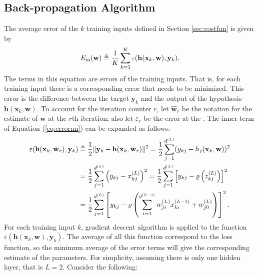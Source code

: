 \subsection{Back-propagation Algorithm}\label{sec:backprop}
The average error of the $k$ training inputs defined in Section \ref{sec:costfun} is given by
\begin{equation}\label{eq:errornn}
E_{\mathrm{in}}(\mathbf{w})\triangleq\frac{1}{K}\sum_{k=1}^{K}\varepsilon(\mathbf{h}(\mathbf{x}_k,\mathbf{w}),\mathbf{y}_k).
\end{equation}
The terms in this equation are errors of the training inputs. That is, for each training input there is a corresponding error that needs to be minimized. This error is the difference between the target $\mathbf{y}_k$ and the output of the hypothesis $\mathbf{h}(\mathbf{x}_k,\mathbf{w})$. To account for the iteration counter $r$, let $\hat{\mathbf{w}}_r$ be the notation for the estimate of $\mathbf{w}$ at the $r$th iteration; also let $\varepsilon_r$ be the error at the . The inner term of Equation (\ref{eq:errornn}) can be expanded as follows:
\begin{align}
\varepsilon(\mathbf{h}(\mathbf{x}_k,\hat{\mathbf{w}}_r),\mathbf{y}_k)&\triangleq\frac{1}{2}\lVert\mathbf{y}_k-\mathbf{h}(\mathbf{x}_k,\hat{\mathbf{w}}_r)\rVert^2=\frac{1}{2}\sum_{j=1}^{d^{(L)}}(y_{kj}-h_j(\mathbf{x}_k,\mathbf{w}))^2\nonumber\\
&=\frac{1}{2}\sum_{j=1}^{d^{(L)}}\left(y_{kj}-x_{kj}^{(L)}\right)^2=\frac{1}{2}\sum_{j=1}^{d^{(L)}}\left[y_{kj}-\varrho\left(z_{kj}^{(L)}\right)\right]^2\nonumber\\
&=\frac{1}{2}\sum_{j=1}^{d^{(L)}}\left[y_{kj}-\varrho\left(\sum_{i=1}^{d^{(L-1)}}w_{ji}^{(L)}x_{ki}^{(L-1)}+w_{j0}^{(L)}\right)\right]^2.
\end{align}
For each training input $k$, gradient descent algorithm is applied to the function $\varepsilon(\mathbf{h}(\mathbf{x}_k,\mathbf{w}),\mathbf{y}_{k})$. The average of all this function correspond to the loss function, so the minimum average of the error terms will give the corresponding estimate of the parameters. For simplicity, assuming there is only one hidden layer, that is $L=2$. Consider the following:

